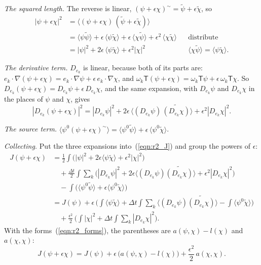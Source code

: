 \emph{The squared length.} The reverse is linear, $(\psi + \epsilon\chi)^\sim = \widetilde\psi + \epsilon\widetilde\chi$, so
\begin{align*}
|\psi + \epsilon\chi|^2 &= \big\langle (\psi + \epsilon\chi)\,(\widetilde\psi + \epsilon\widetilde\chi)\big\rangle \\
&= \langle\psi\widetilde\psi\rangle + \epsilon\,\langle\psi\widetilde\chi\rangle + \epsilon\,\langle\chi\widetilde\psi\rangle + \epsilon^2\,\langle\chi\widetilde\chi\rangle && \text{distribute} \\
&= |\psi|^2 + 2\epsilon\,\langle\psi\widetilde\chi\rangle + \epsilon^2|\chi|^2 && \langle\chi\widetilde\psi\rangle = \langle\psi\widetilde\chi\rangle .
\end{align*}

\emph{The derivative term.} $D_{e_k}$ is linear, because both of its parts are: $e_k\cdot\nabla(\psi + \epsilon\chi) = e_k\cdot\nabla\psi + \epsilon\, e_k\cdot\nabla\chi$, and $\omega_k\mathsf T(\psi + \epsilon\chi) = \omega_k\mathsf T\psi + \epsilon\,\omega_k\mathsf T\chi$. So $D_{e_k}(\psi + \epsilon\chi) = D_{e_k}\psi + \epsilon\, D_{e_k}\chi$, and the same expansion, with $D_{e_k}\psi$ and $D_{e_k}\chi$ in the places of $\psi$ and $\chi$, gives
\begin{equation*}
|D_{e_k}(\psi + \epsilon\chi)|^2 = |D_{e_k}\psi|^2 + 2\epsilon\,\big\langle (D_{e_k}\psi)\,\widetilde{(D_{e_k}\chi)}\big\rangle + \epsilon^2|D_{e_k}\chi|^2 .
\end{equation*}

\emph{The source term.} $\langle\psi^0(\psi + \epsilon\chi)^\sim\rangle = \langle\psi^0\widetilde\psi\rangle + \epsilon\,\langle\psi^0\widetilde\chi\rangle$.

\emph{Collecting.} Put the three expansions into~(\ref{eqn:r2_J}) and group the powers of $\epsilon$:
\begin{align*}
J(\psi + \epsilon\chi) &= \frac12\int\big(|\psi|^2 + 2\epsilon\langle\psi\widetilde\chi\rangle + \epsilon^2|\chi|^2\big) \\
&\quad + \frac{\Delta t}2\int\sum_k\big(|D_{e_k}\psi|^2 + 2\epsilon\langle (D_{e_k}\psi)\widetilde{(D_{e_k}\chi)}\rangle + \epsilon^2|D_{e_k}\chi|^2\big) \\
&\quad - \int\big(\langle\psi^0\widetilde\psi\rangle + \epsilon\langle\psi^0\widetilde\chi\rangle\big) \\
&= J(\psi) + \epsilon\,\Big(\int\langle\psi\widetilde\chi\rangle + \Delta t\int\sum_k\langle (D_{e_k}\psi)\widetilde{(D_{e_k}\chi)}\rangle - \int\langle\psi^0\widetilde\chi\rangle\Big) \\
&\quad + \frac{\epsilon^2}2\,\Big(\int|\chi|^2 + \Delta t\int\sum_k|D_{e_k}\chi|^2\Big) .
\end{align*}
With the forms~(\ref{eqn:r2_forms}), the parentheses are $a(\psi, \chi) - l(\chi)$ and $a(\chi, \chi)$:
\begin{equation*}
J(\psi + \epsilon\chi) = J(\psi) + \epsilon\,\big( a(\psi, \chi) - l(\chi) \big) + \frac{\epsilon^2}{2}\, a(\chi, \chi) .
\end{equation*}

